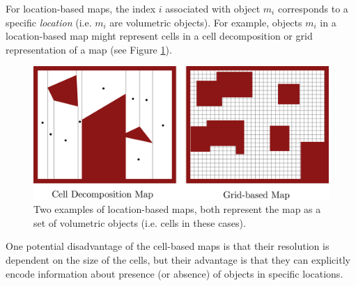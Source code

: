 For location-based maps, the index $i$ associated with object $m_i$ corresponds to a specific \textit{location} (i.e. $m_i$ are volumetric objects). For example, objects $m_i$ in a location-based map might represent cells in a cell decomposition or grid representation of a map (see Figure \ref{fig:LocationBasedMaps}).
\begin{figure}[ht]
\centering
\includegraphics[width=.75\linewidth]{tex/figs/ch17_figs/location_based_maps.png}
\caption{Two examples of location-based maps, both represent the map as a set of volumetric objects (i.e. cells in these cases).}
\label{fig:LocationBasedMaps}
\end{figure}
One potential disadvantage of the cell-based maps is that their resolution is dependent on the size of the cells, but their advantage is that they can explicitly encode information about presence (or absence) of objects in specific locations.


